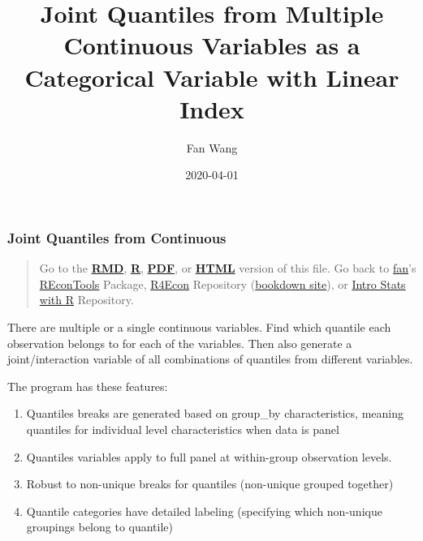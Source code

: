 \documentclass[
]{article}
\title{Joint Quantiles from Multiple Continuous Variables as a Categorical
Variable with Linear Index}
\author{Fan Wang}
\date{2020-04-01}
\providecommand{\tightlist}{%
  \setlength{\itemsep}{0pt}\setlength{\parskip}{0pt}}
\begin{document}
\maketitle

{
\hypersetup{linkcolor=}
\setcounter{tocdepth}{3}
\tableofcontents
}
\hypertarget{joint-quantiles-from-continuous}{%
\subsubsection{Joint Quantiles from
Continuous}\label{joint-quantiles-from-continuous}}

\begin{quote}
Go to the
\href{https://github.com/FanWangEcon//R4Econ/blob/master/summarize/dist//fst_quantiles_joint_discrete.Rmd}{\textbf{RMD}},
\href{https://github.com/FanWangEcon//R4Econ/blob/master/summarize/dist//htmlpdfr/fst_quantiles_joint_discrete.R}{\textbf{R}},
\href{https://github.com/FanWangEcon//R4Econ/blob/master/summarize/dist//htmlpdfr/fst_quantiles_joint_discrete.pdf}{\textbf{PDF}},
or
\href{https://fanwangecon.github.io//R4Econ/summarize/dist//htmlpdfr/fst_quantiles_joint_discrete.html}{\textbf{HTML}}
version of this file. Go back to
\href{http://fanwangecon.github.io/}{fan}'s
\href{https://fanwangecon.github.io/REconTools/}{REconTools} Package,
\href{https://fanwangecon.github.io/R4Econ/}{R4Econ} Repository
(\href{https://fanwangecon.github.io/R4Econ/bookdown}{bookdown site}),
or \href{https://fanwangecon.github.io/Stat4Econ/}{Intro Stats with R}
Repository.
\end{quote}

There are multiple or a single continuous variables. Find which quantile
each observation belongs to for each of the variables. Then also
generate a joint/interaction variable of all combinations of quantiles
from different variables.

The program has these features:

\begin{enumerate}
\def\labelenumi{\arabic{enumi}.}
\tightlist
\item
  Quantiles breaks are generated based on group\_by characteristics,
  meaning quantiles for individual level characteristics when data is
  panel
\item
  Quantiles variables apply to full panel at within-group observation
  levels.
\item
  Robust to non-unique breaks for quantiles (non-unique grouped
  together)
\item
  Quantile categories have detailed labeling (specifying which
  non-unique groupings belong to quantile)
\end{enumerate}
\end{document}
